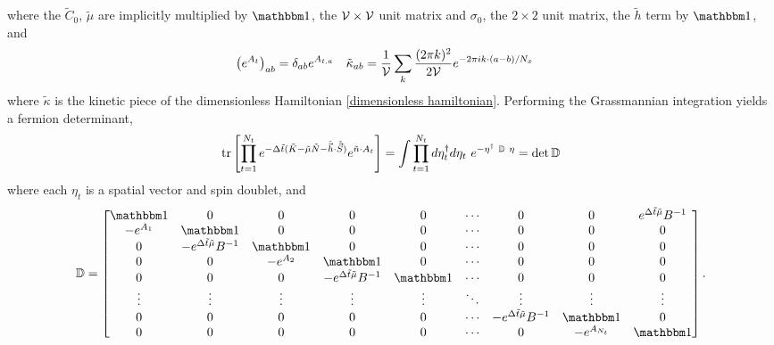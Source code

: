 where the $\tilde{C}_0$, $\tilde{\mu}$ are implicitly multiplied by $\one$, the $\mathcal{V} \times \mathcal{V}$ unit matrix and $\sigma_0$, the $2\times2$ unit matrix, the $\tilde{h}$ term by $\one$, and
\begin{align}
	\left( e^{A_t} \right)_{ab} &= \delta_{ab} e^{A_{t,a}}
	&
	\tilde{\kappa}_{ab} &= \frac{1}{\mathcal{V}} \sum_{k} \frac{(2\pi k)^2}{2 \mathcal{V}} e^{-2\pi i k \cdot(a-b)/N_x} 
\end{align}
where $\tilde{\kappa}$ is the kinetic piece of the dimensionless Hamiltonian \eqref{dimensionless hamiltonian}.
Performing the Grassmannian integration yields a fermion determinant,
\begin{align}
	\text{tr}\left[\prod_{t=1}^{N_t} e^{-\Delta \tilde{t}(\tilde{K} - \tilde{\mu} \tilde{N} - \tilde{\vec{h}}\cdot\tilde{\vec{S}})} e^{ \tilde{n}\cdot A_t} \right]
	=
	\int \prod_{t=1}^{N_t} d \eta^{\dagger}_t d\eta_t ~ e^{- \eta^{\dagger} ~ \mathbb{D} ~ \eta} = \det \mathbb{D}
\end{align}
where each $\eta_t$ is a spatial vector and spin doublet, and 
\begin{equation}
	\mathbb{D}
	=
	\begin{bmatrix} 
		\one     & 0                                        & 0        & 0                                        & 0      & \cdots & 0                                        & 0            & e^{\Delta \tilde{t} \tilde{\mu}} B^{-1}
	\\	-e^{A_1} & \one                                     & 0        & 0                                        & 0      & \cdots & 0                                        & 0            & 0
	\\	0        & -e^{\Delta \tilde{t} \tilde{\mu}} B^{-1} & \one     & 0                                        & 0      & \cdots & 0                                        & 0            & 0
	\\	0        & 0                                        & -e^{A_2} & \one                                     & 0      & \cdots & 0                                        & 0            & 0
	\\	0        & 0                                        & 0        & -e^{\Delta \tilde{t} \tilde{\mu}} B^{-1} & \one   & \cdots & 0                                        & 0            & 0
	\\	\vdots   & \vdots                                   & \vdots   & \vdots                                   & \vdots & \ddots & \vdots                                   & \vdots       & \vdots
	\\	0        & 0                                        & 0        & 0                                        & 0      & \cdots & -e^{\Delta \tilde{t} \tilde{\mu}} B^{-1} & \one         & 0
	\\	0        & 0                                        & 0        & 0                                        & 0      & \cdots & 0                                        & -e^{A_{N_t}} & \one
	\end{bmatrix}.
\end{equation}
